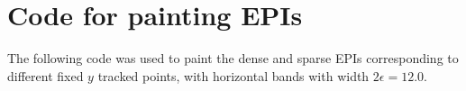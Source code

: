 \chapter{Code for painting EPIs}
\label{sec:Appendix_B}

The following code was used to paint the dense and sparse EPIs corresponding to different fixed $y$ tracked points, with horizontal bands with width $2\epsilon=12.0$.



